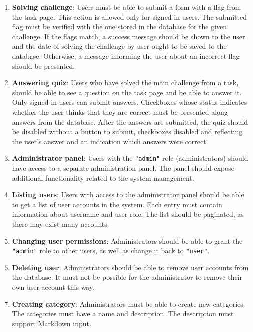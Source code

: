 \begin{enumerate}
	\item \textbf{Solving challenge}: Users must be able to submit a form with a flag from the task page. This action is allowed only for signed-in users. The submitted flag must be verified with the one stored in the database for the given challenge. If the flags match, a success message should be shown to the user and the date of solving the challenge by user ought to be saved to the database. Otherwise, a message informing the user about an incorrect flag should be presented.

	\item \textbf{Answering quiz}: Users who have solved the main challenge from a task, should be able to see a question on the task page and be able to answer it. Only signed-in users can submit answers. Checkboxes whose status indicates whether the user thinks that they are correct must be presented along answers from the database. After the answers are submitted, the quiz should be disabled without a button to submit, checkboxes disabled and reflecting the user's answer and an indication which answers were correct.

	\item \textbf{Administrator panel}: Users with the \texttt{"admin"} role (administrators) should have access to a separate administration panel. The panel should expose additional functionality related to the system management.

	\item \textbf{Listing users}: Users with access to the administrator panel should be able to get a list of user accounts in the system. Each entry must contain information about username and user role. The list should be paginated, as there may exist many accounts.

	\item \textbf{Changing user permissions}: Administrators should be able to grant the \texttt{"admin"} role to other users, as well as change it back to \texttt{"user"}.

	\item \textbf{Deleting user}: Administrators should be able to remove user accounts from the database. It must not be possible for the administrator to remove their own user account this way.

	\item \textbf{Creating category}: Administrators must be able to create new categories. The categories must have a name and description. The description must support Markdown input.


\end{enumerate}
